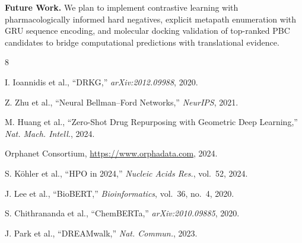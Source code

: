 \documentclass[conference]{IEEEtran}
\begin{document}
\textbf{Future Work.} We plan to implement contrastive learning with pharmacologically informed hard negatives, explicit metapath enumeration with GRU sequence encoding, and molecular docking validation of top-ranked PBC candidates to bridge computational predictions with translational evidence.

\begin{thebibliography}{8}

I. Ioannidis et al., ``DRKG,'' \textit{arXiv:2012.09988}, 2020.

Z. Zhu et al., ``Neural Bellman--Ford Networks,'' \textit{NeurIPS}, 2021.

M. Huang et al., ``Zero-Shot Drug Repurposing with Geometric Deep Learning,'' \textit{Nat. Mach. Intell.}, 2024.

Orphanet Consortium, \url{https://www.orphadata.com}, 2024.

S. K\"{o}hler et al., ``HPO in 2024,'' \textit{Nucleic Acids Res.}, vol.~52, 2024.

J. Lee et al., ``BioBERT,'' \textit{Bioinformatics}, vol.~36, no.~4, 2020.

S. Chithrananda et al., ``ChemBERTa,'' \textit{arXiv:2010.09885}, 2020.

J. Park et al., ``DREAMwalk,'' \textit{Nat. Commun.}, 2023.

\end{thebibliography}
\end{document}
